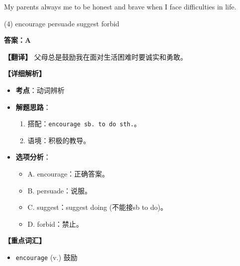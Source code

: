 \documentclass[11pt, a4paper]{article}
\newcommand{\analysis}[4]{
    \begin{solutionbox}
        \textbf{答案：#1}
        
        \textbf{【翻译】} #2
        
        \textbf{【详细解析】}
        #3
        
        \textbf{【重点词汇】}
        #4
    \end{solutionbox}
}
\newcommand{\blank}{\underline{\hspace{1.5cm}}}
\begin{document}
\begin{questions}
    \item My parents always \blank me to be honest and brave when I face difficulties in life.
    \begin{tasks}(4)
        \task encourage \task persuade \task suggest \task forbid
    \end{tasks}
    \analysis{A}{父母总是鼓励我在面对生活困难时要诚实和勇敢。}{
        \begin{itemize}
            \item \textbf{考点}：动词辨析
            \item \textbf{解题思路}：
                \begin{enumerate}
                    \item 搭配：\texttt{encourage sb. to do sth.}。
                    \item 语境：积极的教导。
                \end{enumerate}
            \item \textbf{选项分析}：
                \begin{itemize}
                    \item A. encourage：正确答案。
                    \item B. persuade：说服。
                    \item C. suggest：suggest doing (不能接sb to do)。
                    \item D. forbid：禁止。
                \end{itemize}
        \end{itemize}
    }{
        \begin{itemize}
            \item \texttt{encourage} (v.) 鼓励
        \end{itemize}
    }
\end{questions}

\end{document}
